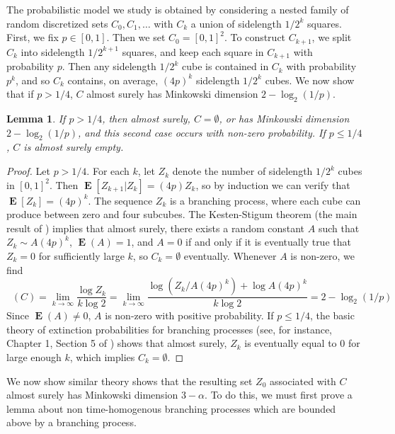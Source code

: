 \documentclass[dvipsnames,letterpaper,12pt]{article}
\theoremstyle{plain}
\newtheorem{lemma}{Lemma}
\DeclareMathOperator{\minkdim}{\dim_{\mathbf{M}}}
\DeclareMathOperator{\Expect}{\mathbf{E}}
\begin{document}
The probabilistic model we study is obtained by considering a nested family of random discretized sets $C_0,C_1, \dots$ with $C_k$ a union of sidelength $1/2^k$ squares. First, we fix $p \in [0,1]$. Then we set $C_0 = [0,1]^2$. To construct $C_{k+1}$, we split $C_k$ into sidelength $1/2^{k+1}$ squares, and keep each square in $C_{k+1}$ with probability $p$. Then any sidelength $1/2^k$ cube is contained in $C_k$ with probability $p^k$, and so $C_k$ contains, on average, $(4p)^k$ sidelength $1/2^k$ cubes. We now show that if $p > 1/4$, $C$ almost surely has Minkowski dimension $2 - \log_2(1/p)$.

\begin{lemma} \label{randomdimension}
	If $p > 1/4$, then almost surely, $C = \emptyset$, or has Minkowski dimension $2 - \log_2(1/p)$, and this second case occurs with non-zero probability. If $p \leq 1/4$, $C$ is almost surely empty.
\end{lemma}
\begin{proof}
	Let $p > 1/4$. For each $k$, let $Z_k$ denote the number of sidelength $1/2^k$ cubes in $[0,1]^2$. Then $\Expect[Z_{k+1}|Z_k] = (4p) Z_k$, so by induction we can verify that $\Expect[Z_k] = (4p)^k$. The sequence $Z_k$ is a branching process, where each cube can produce between zero and four subcubes. The Kesten-Stigum theorem (the main result of \cite{KestenStigum}) implies that almost surely, there exists a random constant $A$ such that $Z_k \sim A (4p)^k$, $\Expect(A) = 1$, and $A = 0$ if and only if it is eventually true that $Z_k = 0$ for sufficiently large $k$, so $C_k = \emptyset$ eventually. Whenever $A$ is non-zero, we find
	\[ \minkdim(C) = \lim_{k \to \infty} \frac{\log Z_k}{k \log 2} = \lim_{k \to \infty} \frac{\log(Z_k/A (4p)^k) + \log A (4p)^k}{k \log 2} = 2 - \log_2(1/p) \]
	Since $\Expect(A) \neq 0$, $A$ is non-zero with positive probability. If $p \leq 1/4$, the basic theory of extinction probabilities for branching processes (see, for instance, Chapter 1, Section 5 of \cite{AthreyaTextbook}) shows that almost surely, $Z_k$ is eventually equal to $0$ for large enough $k$, which implies $C_k = \emptyset$.
\end{proof}

We now show similar theory shows that the resulting set $Z_0$ associated with $C$ almost surely has Minkowski dimension $3 - \alpha$. To do this, we must first prove a lemma about non time-homogenous branching processes which are bounded above by a branching process.
\end{document}
